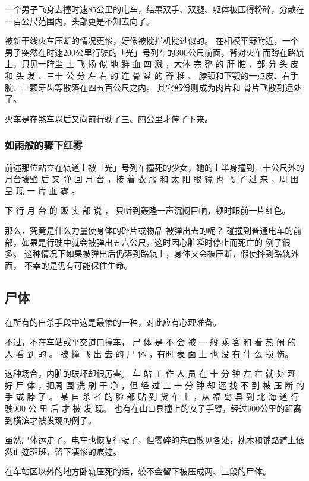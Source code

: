 \documentclass[UTF8]{ctexart}
\begin{document}
一个男子飞身去撞时速$85$公里的电车，结果双手、双腿、躯体被压得粉碎，分散在一百公尺范围内，头部更是不知去向了。

被新干线火车压断的情况更惨，好像被搅拌机搅过似的。
在相模平野附近，一个男子突然在时速$200$公里行驶的「光」号列车的$300$公尺前面，背对火车而蹲在路轨上，只见一阵尘 土 飞 扬 似 地 鲜 血 四 溅 ，大体 完 整 的 肝 脏 、部 分 头 皮 和 头 发 、三十 公 分 左 右 的 连 骨 盆 的 脊 椎 、 脖颈和下颚的一点皮、右手腕、三颗牙齿等散落在四五百公尺之内。
其它部份则成为肉片和 骨片飞散到远处了。

火车是在煞车以后又向前行驶了三、四公里才停了下来。 

\subsubsection*{如雨般的骤下红雾}

前述那位站立在轨道上被「光」号列车撞死的少女，她的上半身撞到三十公尺外的月台墙壁 后 又 弹 回 月 台 ，接 着 衣 服 和 太 阳 眼 镜 也 飞 了 过 来 ，周 围 呈 现 一 片 血 雾 。

下 行 月 台 的 贩 卖 部 说 ， 只听到轰隆一声沉闷巨响，顿时眼前一片红色。

那么，究竟是什么力量使身体的碎片或物品 被弹出去的呢？ 碰撞到普通电车的前部，如果是行驶中就会被弹出五六公尺，这时因心脏瞬时停止而死亡的 例子很多。
这种情况下如果被弹出后仍落到路轨上，身体又会被压断，假使摔到路轨外面， 不幸的是仍有可能保住生命。

\subsection{尸体}

在所有的自杀手段中这是最惨的一种，对此应有心理准备。

不过，不在车站或平交道口撞车， 尸 体 是 不 会 被 一 般 乘 客 和 看 热 闹 的 人 看 到 的 。
被 撞 飞 出 去 的 尸 体 ，有时 表 面 上 也 没 有 什 么 损 伤。

这种场合，内脏的破坏却很厉害。 
车 站 工 作 人 员 在 十 分 钟 左 右 就 处 理 好 尸 体 ，把周 围 洗 刷 干 净 ，但 经 过 三 十 分 钟 却 还 找 不 到 被 压 断 的 手 或 脖 子 。
某 自 杀 者 的 脸 部 贴 到 货 车 上 ，从 福 岛 县 到 北 海 道 行 驶$900$ 公 里 后 才 被 发 现。
也有在山口县撞上的女子手臂，经过$900$公里的距离到横滨才被发现的例子。 

虽然尸体运走了，电车也恢复行驶了，但零碎的东西散见各处，枕木和铺路道上依然血迹斑斑，留下凄惨的痕迹。

在车站区以外的地方卧轨压死的话，较不会留下被压成两、三段的尸体。
\end{document}
